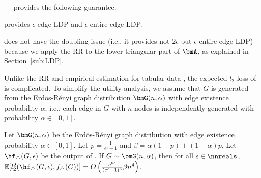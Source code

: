 \smallskip
{}~~ 
provides the following guarantee.

\begin{theorem}\label{thm:subgraph-rr_LDP}
   provides $\epsilon$-edge LDP and $\epsilon$-entire edge LDP.
\end{theorem}

 does not have the doubling issue (i.e., it provides not $2\epsilon$ but $\epsilon$-entire edge LDP) because we apply the RR to the lower triangular part of $\bmA$, as explained in Section~\ref{sub:LDP}.

Unlike the RR and empirical estimation for tabular data \cite{Kairouz_ICML16}, the expected $l_2$ loss of  is complicated. 
To simplify the utility analysis, we assume that $G$ is generated from the Erd\"os-R\'enyi graph distribution $\bmG(n,\alpha)$ with edge existence probability $\alpha$; i.e., each edge in $G$ with $n$ nodes is independently generated with probability $\alpha \in [0,1]$.

\begin{theorem}\label{thm:subgraph-rr}
  Let $\bmG(n,\alpha)$ be the Erd\"os-R\'enyi graph distribution with edge existence probability $\alpha \in [0,1]$. 
  Let $p = \frac{1}{e^\epsilon+1}$ and 
  $\beta = \alpha(1-p) + (1-\alpha)p$. 
  Let 
  $\hf_{\triangle}(G, \epsilon)$ 
  be the output of 
  .
  If 
  $G \sim \bmG(n,\alpha)$, 
  then for all 
  $\epsilon \in \nnreals$, 
  $\mathbb{E}[l_2^2(\hf_{\triangle}(G, \epsilon),
  f_\triangle(G))] = 
  O\left(\frac{e^{6\epsilon}}{(e^\epsilon-1)^6}\beta n^4\right)$.
\end{theorem}


